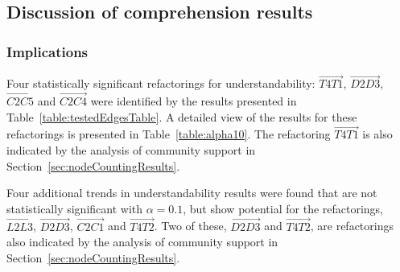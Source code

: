 \subsection{Discussion of comprehension results}

\subsubsection{Implications}
Four statistically significant refactorings for understandability: $\overrightarrow{T4 T1}$, $\overrightarrow{D2 D3}$, $\overrightarrow{C2 C5}$ and $\overrightarrow{C2 C4}$ were identified by the results presented in Table~\ref{table:testedEdgesTable}.  A detailed view of the results for these refactorings is presented in Table~\ref{table:alpha10}.  The refactoring $\overrightarrow{T4 T1}$ is also indicated by the analysis of community support in Section~\ref{sec:nodeCountingResults}.

Four additional trends in understandability results were found that are not statistically significant with $\alpha=0.1$, but show potential for the refactorings, $\overrightarrow{L2 L3}$, $\overrightarrow{D2 D3}$, $\overrightarrow{C2 C1}$ and $\overrightarrow{T4 T2}$.  Two of these, $\overrightarrow{D2 D3}$ and $\overrightarrow{T4 T2}$, are refactorings also indicated by the analysis of community support in Section~\ref{sec:nodeCountingResults}.

